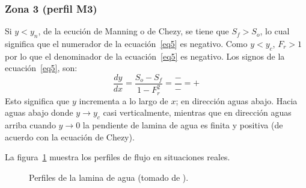 \documentclass[11pt, oneside]{article}
\begin{document}
\subsubsection*{Zona 3 (perfil M3)}
Si $y < y_n$, de la ecuci\'on de Manning o de Chezy, se tiene que $S_f > S_o$, lo cual significa que el numerador de la ecuaci\'on~\ref{eq5} es negativo. Como $y < y_c$, $F_r >1$ por lo que el denominador de la ecuaci\'on~\ref{eq5} es negativo. Los signos de la ecuaci\'on~\ref{eq5}, son:
$$
\frac{dy}{dx} = \frac{S_o - S_f}{1-F_r^2} = \frac{-}{-} = +
$$
Esto significa que $y$ incrementa a lo largo de $x$; en direcci\'on aguas abajo. Hacia aguas abajo donde $y \rightarrow y_c$ casi verticalmente, mientras que en direcci\'on aguas arriba cuando $y \rightarrow 0$ la pendiente de lamina de agua es finita y positiva (de acuerdo con la ecuaci\'on de Chezy). 

La figura~\ref{fig4} muestra los perfiles de flujo en situaciones reales.
\begin{figure}[h]
\centering
\caption{Perfiles de la lamina de agua (tomado de \cite{Chau}).}
\label{fig4}
\end{figure}
\end{document}
